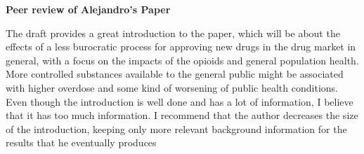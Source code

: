 \documentclass[12pt, a4paper]{article}
\begin{document}
\textbf{{\Large Peer review of Alejandro's Paper}}

\vspace{1cm}

The draft provides a great introduction to the paper, which will be about the effects of a less burocratic process for approving new drugs in the drug market in general, with a focus on the impacts of the opioids and general population health. More controlled substances available to the general public might be associated with higher overdose and some kind of worsening of public health conditions. Even though the introduction is well done and has a lot of information, I believe that it has too much information. I recommend that the author decreases the size of the introduction, keeping only more relevant background information for the results that he eventually produces
\end{document}
